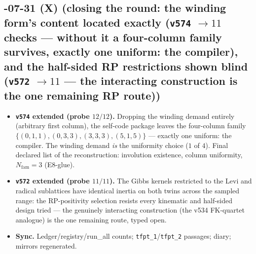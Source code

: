 \subsection*{-07-31 (X) (closing the round: the winding form's content located exactly (\texttt{v574} $\to11$ checks --- without it a four-column family survives, exactly one uniform: the compiler), and the half-sided RP restrictions shown blind (\texttt{v572} $\to11$ --- the interacting construction is the one remaining RP route))}
\begin{itemize}[leftmargin=1.5em]
\item \textbf{\texttt{v574} extended (probe $12/12$).} Dropping the winding demand entirely
(arbitrary first column), the self-code package leaves the four-column family
$\{(0,1,1),(0,3,3),(3,3,3),(5,1,5)\}$ --- exactly one uniform: the compiler.  The winding
demand \emph{is} the uniformity choice ($1$ of $4$).  Final declared list of the
reconstruction: involution existence, column uniformity, $N_{\mathrm{fam}}=3$ (E8-glue).
\item \textbf{\texttt{v572} extended (probe $11/11$).} The Gibbs kernels restricted to the
Levi and radical sublattices have identical inertia on both twins across the sampled range:
the RP-positivity selection resists every kinematic and half-sided design tried --- the
genuinely interacting construction (the v534 FK-quartet analogue) is the one remaining route,
typed open.
\item \textbf{Sync.} Ledger/registry/run\_all counts; \texttt{tfpt\_1}/\texttt{tfpt\_2}
passages; diary; mirrors regenerated.
\end{itemize}

